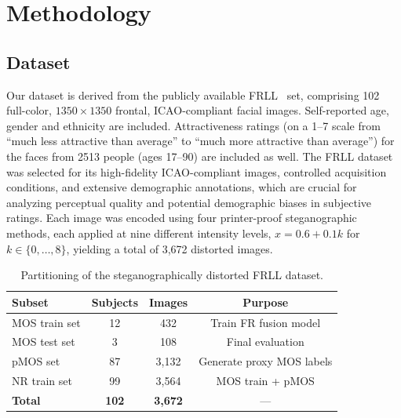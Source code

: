 \chapter{Methodology}\label{chap:methodology}

\section{Dataset}

Our dataset is derived from the publicly available \acs{FRLL}~\cite{frll} set, comprising 102 full-color, $1350 \times 1350$ frontal, \acs{ICAO}-compliant facial images. Self-reported age, gender and ethnicity are included. Attractiveness ratings (on a 1--7 scale from ``much less attractive than average'' to ``much more attractive than average'') for the faces from 2513 people (ages 17--90) are included as well. The \acs{FRLL} dataset was selected for its high-fidelity \acs{ICAO}-compliant images, controlled acquisition conditions, and extensive demographic annotations, which are crucial for analyzing perceptual quality and potential demographic biases in subjective ratings. Each image was encoded using four printer-proof steganographic methods, each applied at nine different intensity levels, $x = 0.6 + 0.1k$ for $k \in \{0,\dots,8\}$, yielding a total of 3,672 distorted images.

\begin{table}[htbp]
\centering
\caption{Partitioning of the steganographically distorted \acs{FRLL} dataset.}
\label{tab:frll_dataset_partition}
\begin{tabular}{lccc}
\hline
\textbf{Subset}     & \textbf{Subjects} & \textbf{Images} & \textbf{Purpose} \\
\hline
\acs{MOS} train set & 12                & 432             & Train \acs{FR} fusion model \\
\acs{MOS} test set  & 3                 & 108             & Final evaluation  \\
\acs{pMOS} set      & 87                & 3{,}132           & Generate proxy \acs{MOS} labels \\
\acs{NR} train set  & 99                & 3{,}564           & \acs{MOS} train + \acs{pMOS} \\
\hline
\textbf{Total}      & \textbf{102}      & \textbf{3{,}672}  & --- \\
\hline
\end{tabular}
\end{table}


